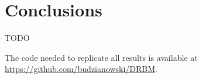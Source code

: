 \chapter*{Conclusions}
TODO


The code needed to replicate all results is available at \url{https://github.com/budzianowski/DRBM}. 

